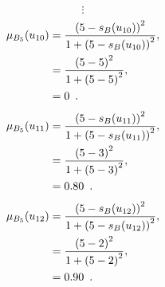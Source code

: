 \documentclass[a4paper,openany]{book}
\begin{document}
				\[
					\vdots
				\]
				\begin{align}
					\mu_{B_5}(u_{10}) &= \frac{\left(5-s_B(u_{10})\right)^2}{1 + \left(5-s_B(u_{10})\right)^2} ,\\
					&= \frac{\left(5-5\right)^2}{1 + \left(5-5\right)^2} \notag ,\\
					&= 0 \enspace. \notag
				\end{align}
				\begin{align}
					\mu_{B_5}(u_{11}) &= \frac{\left(5-s_B(u_{11})\right)^2}{1 + \left(5-s_B(u_{11})\right)^2} ,\\
					&= \frac{\left(5-3\right)^2}{1 + \left(5-3\right)^2} \notag ,\\
					&= 0.80 \enspace. \notag
				\end{align}
				\begin{align}
					\mu_{B_5}(u_{12}) &= \frac{\left(5-s_B(u_{12})\right)^2}{1 + \left(5-s_B(u_{12})\right)^2} ,\\
					&= \frac{\left(5-2\right)^2}{1 + \left(5-2\right)^2} \notag ,\\
					&= 0.90 \enspace. \notag
				\end{align}
\end{document}
